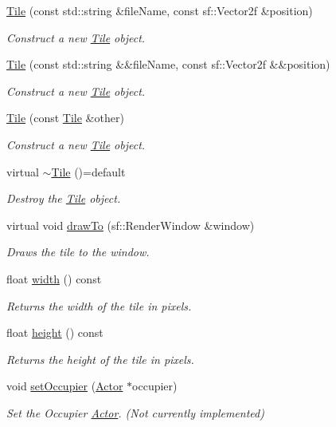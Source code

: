\begin{DoxyCompactItemize}
\item 
\mbox{\hyperlink{classTile_aa56994a706f8b5f5468d7fa7c9820346}{Tile}} (const std\+::string \&file\+Name, const sf\+::\+Vector2f \&position)
\begin{DoxyCompactList}\small\item\em Construct a new \mbox{\hyperlink{classTile}{Tile}} object. \end{DoxyCompactList}\item 
\mbox{\hyperlink{classTile_a6583b7a8d50b38d972865eb3440251fc}{Tile}} (const std\+::string \&\&file\+Name, const sf\+::\+Vector2f \&\&position)
\begin{DoxyCompactList}\small\item\em Construct a new \mbox{\hyperlink{classTile}{Tile}} object. \end{DoxyCompactList}\item 
\mbox{\hyperlink{classTile_a480e50775203166df068f0cfc889d91b}{Tile}} (const \mbox{\hyperlink{classTile}{Tile}} \&other)
\begin{DoxyCompactList}\small\item\em Construct a new \mbox{\hyperlink{classTile}{Tile}} object. \end{DoxyCompactList}\item 
virtual \mbox{\hyperlink{classTile_aecd90209e168f26bcdf36c2e445f424a}{$\sim$\+Tile}} ()=default
\begin{DoxyCompactList}\small\item\em Destroy the \mbox{\hyperlink{classTile}{Tile}} object. \end{DoxyCompactList}\item 
virtual void \mbox{\hyperlink{classTile_ab83f64c1d7fdeba49f9d84bd1a33e612}{draw\+To}} (sf\+::\+Render\+Window \&window)
\begin{DoxyCompactList}\small\item\em Draws the tile to the window. \end{DoxyCompactList}\item 
float \mbox{\hyperlink{classTile_a819194106af71d48f48d0fedfcccc31e}{width}} () const
\begin{DoxyCompactList}\small\item\em Returns the width of the tile in pixels. \end{DoxyCompactList}\item 
float \mbox{\hyperlink{classTile_a93878ba24748c81017215d97efd1a2f0}{height}} () const
\begin{DoxyCompactList}\small\item\em Returns the height of the tile in pixels. \end{DoxyCompactList}\item 
void \mbox{\hyperlink{classTile_ace2e0e7d2aacf0190bcf10bf34a0c9f2}{set\+Occupier}} (\mbox{\hyperlink{classActor}{Actor}} $\ast$occupier)
\begin{DoxyCompactList}\small\item\em Set the Occupier \mbox{\hyperlink{classActor}{Actor}}. (Not currently implemented) \end{DoxyCompactList}\end{DoxyCompactItemize}


